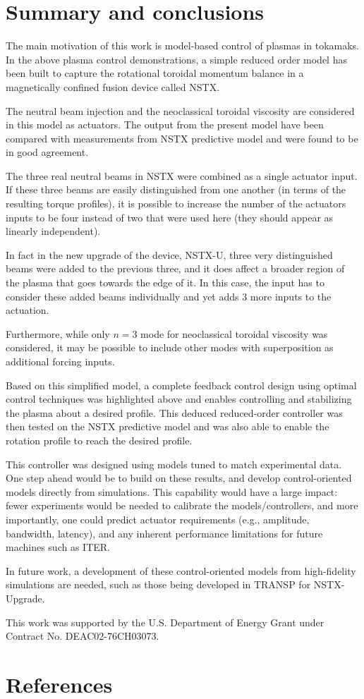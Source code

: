 \documentclass[12pt]{iopart}
\begin{document}
\section{Summary and conclusions}
The main motivation of this work is model-based control of plasmas in tokamaks.
In the above plasma control demonstrations, a simple reduced order model has been built to capture the rotational toroidal momentum balance in a magnetically confined fusion device called NSTX.

The neutral beam injection and the neoclassical toroidal viscosity are considered in this model as actuators. The output from the present model have been compared with measurements from NSTX predictive model and were found to be in good agreement.

The three real neutral beams in NSTX were combined as a single actuator input. If these three beams are easily distinguished from one another (in terms of the resulting torque profiles), it is possible to increase the number of the actuators inputs to be four instead of two that were used here (they should appear as linearly independent). 

In fact in the new upgrade of the device, NSTX-U, three very distinguished beams were added to the previous three, and it does affect a broader region of the plasma that goes towards the edge of it. In this case, the input has to consider these added beams individually and yet adds 3 more inputs to the actuation.

Furthermore, while only $n=3$ mode for neoclassical toroidal viscosity was considered, it may be possible to include other modes with superposition as additional forcing inputs.

Based on this simplified model, a complete feedback control design using optimal control techniques was highlighted above and enables controlling and stabilizing the plasma about a desired profile. This deduced reduced-order controller was then tested on the NSTX predictive model and was also able to enable the rotation profile to reach the desired profile.

This controller was designed using models tuned to match experimental data. One step ahead would be to build on these results,
and develop control-oriented models directly from simulations. This capability would have a large impact: fewer experiments would be needed to calibrate the models/controllers, and more importantly, one could predict actuator requirements (e.g., amplitude, bandwidth, latency), and any inherent performance limitations for future machines such as ITER.

In future work, a development of these control-oriented models from high-fidelity simulations are needed, such as those being developed in TRANSP for NSTX-Upgrade. 

 
\ack 

This work was supported by the U.S. Department of Energy Grant under Contract No. DEAC02-76CH03073.


\section*{References}



\end{document}
